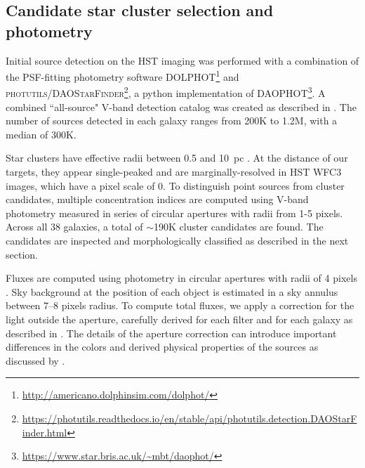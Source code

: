 \documentclass[]{aastex631}
\begin{document}
\subsection{Candidate star cluster selection and photometry}\label{ssect:select_photo}

Initial source detection \citep{thilker_phangs-hst_2022} on the HST imaging was performed with a combination of the PSF-fitting photometry software \textsc{DOLPHOT}\footnote{\url{http://americano.dolphinsim.com/dolphot/}} \citep[v2.0,][]{dolphin_dolphot_2016} and \textsc{photutils/DAOStarFinder}\footnote{\url{https://photutils.readthedocs.io/en/stable/api/photutils.detection.DAOStarFinder.html}}\citep[][]{bradley_astropyphotutils_2023}, a python implementation of \textsc{DAOPHOT}\footnote{\url{https://www.star.bris.ac.uk/~mbt/daophot/}}\citep[v1.3-2][]{stetson_daophot_1987}. A combined ``all-source" V-band detection catalog was created as described in \citet{thilker_phangs-hst_2022}. The number of sources detected in each galaxy ranges from 200K to 1.2M, with a median of 300K.


Star clusters have effective radii between 0.5 and 10~pc \citep{portegies_zwart_young_2010,ryon_effective_2017,krumholz_star_2019,brown_radii_2021}. At the distance of our targets, they appear single-peaked and are marginally-resolved in HST WFC3 images, which have a pixel scale of 0.  To distinguish point sources from cluster candidates, multiple concentration indices \citep[MCI, ][]{thilker_phangs-hst_2022} are computed using V-band photometry measured in series of circular apertures with radii from 1-5 pixels.  Across all 38 galaxies, a total of $\sim$190K cluster candidates are found.  The candidates are inspected and morphologically classified as described in the next section.  

Fluxes are computed using photometry in circular apertures with radii of 4 pixels \citep[$\sim$ 0; which subtends 3.4 to 18 pc for galaxy distances 5 to 23 Mpc spanned by the PHANGS-HST sample, see][Table 1]{lee_phangs-hst_2022}. Sky background at the position of each object is estimated in a sky annulus between 7--8 pixels radius. To compute total fluxes, we apply a correction for the light outside the aperture, carefully derived for each filter and for each galaxy as described in \cite{deger_bright_2022}.  The details of the aperture correction can introduce important differences in the colors and derived physical properties of the sources as discussed by \cite{deger_bright_2022}.
\end{document}
